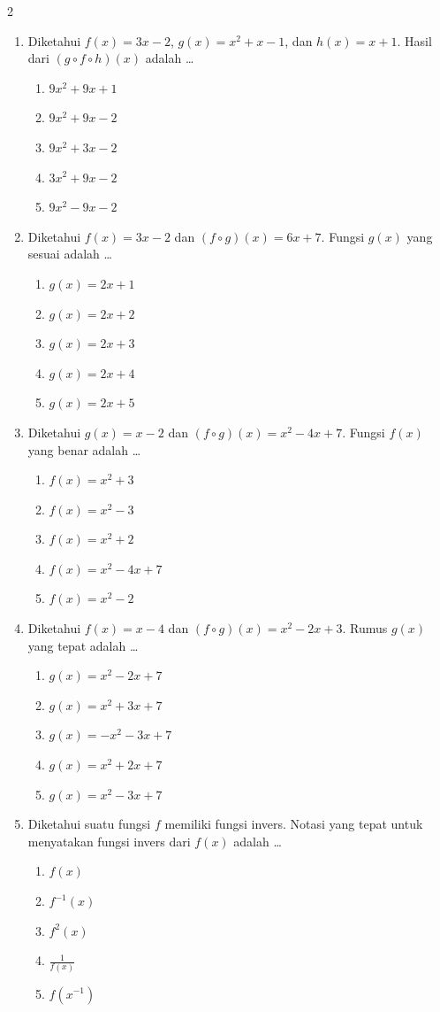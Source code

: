 \documentclass[10pt,a4paper]{article}
\begin{document}
\begin{multicols}{2}
\begin{enumerate}
    \item Diketahui $f(x)=3x-2$, $g(x)=x^2+x-1$, dan $h(x)=x+1$. Hasil dari $(g\circ f\circ h)(x)$ adalah \dots
    \begin{enumerate}
        \item $9x^2+9x+1$
        \item $9x^2+9x-2$
        \item $9x^2+3x-2$
        \item $3x^2+9x-2$
        \item $9x^2-9x-2$
    \end{enumerate}

    \item Diketahui $f(x)=3x-2$ dan $(f\circ g)(x)=6x+7$. Fungsi $g(x)$ yang sesuai adalah \dots
    \begin{enumerate}
        \item $g(x)=2x+1$
        \item $g(x)=2x+2$
        \item $g(x)=2x+3$
        \item $g(x)=2x+4$
        \item $g(x)=2x+5$
    \end{enumerate}

    \item Diketahui $g(x)=x-2$ dan $(f\circ g)(x)=x^2-4x+7$. Fungsi $f(x)$ yang benar adalah \dots
    \begin{enumerate}
        \item $f(x)=x^2+3$
        \item $f(x)=x^2-3$
        \item $f(x)=x^2+2$
        \item $f(x)=x^2-4x+7$
        \item $f(x)=x^2-2$
    \end{enumerate}

    \item Diketahui $f(x)=x-4$ dan $(f\circ g)(x)=x^2-2x+3$. Rumus $g(x)$ yang tepat adalah \dots
    \begin{enumerate}
        \item $g(x)=x^2-2x+7$
        \item $g(x)=x^2+3x+7$
        \item $g(x)=-x^2-3x+7$
        \item $g(x)=x^2+2x+7$
        \item $g(x)=x^2-3x+7$
    \end{enumerate}

    \item Diketahui suatu fungsi $f$ memiliki fungsi invers. Notasi yang tepat untuk menyatakan fungsi invers dari $f(x)$ adalah \dots
    \begin{enumerate}
        \item $f(x)$
        \item $f^{-1}(x)$
        \item $f^2(x)$
        \item $\frac{1}{f(x)}$
        \item $f(x^{-1})$
    \end{enumerate}


\end{enumerate}
\end{multicols}
\end{document}
